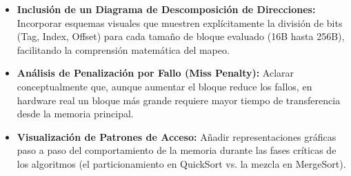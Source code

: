 \documentclass[12pt, a4paper]{article}
\begin{document}
\begin{itemize}
\begin{itemize}
    \item \textbf{Diapositiva 2 (Optimización C++):} {Una diapositiva de presentación técnica, moderna y nítida, titulada "Alineación a 64B y optimización de pila en C++"\ sobre un fondo de interfaz oscura y futurista. Diseño dividido: a la izquierda, una ventana de editor de código que muestra la estructura de C++ `struct alignas(64) CachedNode { double val; int id; char pad[52]; };' con resaltado de sintaxis claro y anotaciones que señalan la alineación de memoria (8 bytes, 4 bytes, relleno de 64B). A la derecha, una lista con viñetas: \"Empaquetado de memoria: ordenar tipos de mayor a menor tamaño", \"Almacenamiento en caché de fusión: pool de búferes preasignados (+3\%\ a +5\%)", \"Control de pila: definir \"depth limit para evitar el desbordamiento de pila (Stack Overflow)".\ En la parte inferior, una etiqueta destacada: "Mitigación de latencia: alineación a 64B frente a pila controlada". Diseño técnico minimalista y elegante; relación de aspecto 16:9.}\\
\end{itemize}
\item \textbf{Inclusión de un Diagrama de Descomposición de Direcciones:} Incorporar esquemas visuales que muestren explícitamente la división de bits (Tag, Index, Offset) para cada tamaño de bloque evaluado (16B hasta 256B), facilitando la comprensión matemática del mapeo. 
\item \textbf{Análisis de Penalización por Fallo (Miss Penalty):} Aclarar conceptualmente que, aunque aumentar el bloque reduce los fallos, en hardware real un bloque más grande requiere mayor tiempo de transferencia desde la memoria principal. 
\item \textbf{Visualización de Patrones de Acceso:} Añadir representaciones gráficas paso a paso del comportamiento de la memoria durante las fases críticas de los algoritmos (el particionamiento en QuickSort vs. la mezcla en MergeSort). 
\end{itemize}
\end{document}
